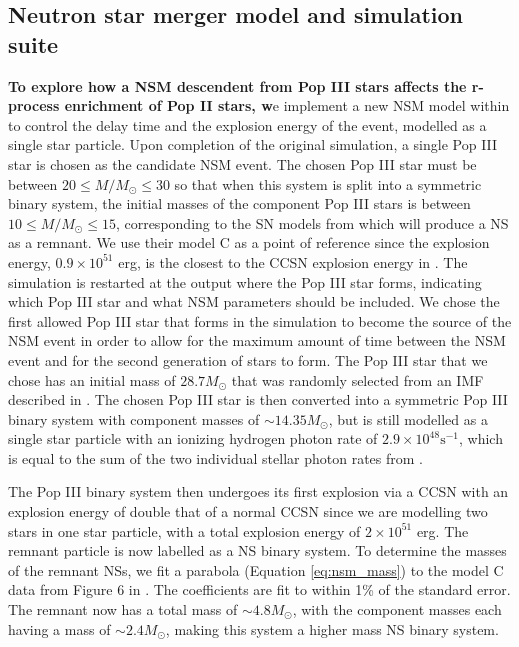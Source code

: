 \documentclass[fleqn,usenatbib]{mnras}
\begin{document}
\subsection{Neutron star merger model and simulation suite} \label{sec:NSM_model}
\textbf{To explore how a NSM descendent from Pop III stars affects the r-process enrichment of Pop II stars, w}e implement a new NSM model within \enzo{} to control the delay time and the explosion energy of the event, modelled as a single star particle. Upon completion of the original simulation, a single Pop III star is chosen as the candidate NSM event. The chosen Pop III star must be between $20 \leq M / M_{\odot} \leq 30$ so that when this system is split into a symmetric binary system, the initial masses of the component Pop III stars is between $10 \leq M / M_{\odot} \leq 15$, corresponding to the SN models from \citet{Heger10} which will produce a NS as a remnant. We use their model C as a point of reference since the explosion energy, $0.9 \times 10^{51}$ erg, is the closest to the CCSN explosion energy in \enzo{}. The simulation is restarted at the output where the Pop III star forms, indicating which Pop III star and what NSM parameters should be included. We chose the first allowed Pop III star that forms in the simulation to become the source of the NSM event in order to allow for the maximum amount of time between the NSM event and for the second generation of stars to form. The Pop III star that we chose has an initial mass of $28.7 M_{\odot}$ that was randomly selected from an IMF described in \citet{Skinner20}. The chosen Pop III star is then converted into a symmetric Pop III binary system with component masses of $\sim 14.35 M_{\odot}$, but is still modelled as a single star particle with an ionizing hydrogen photon rate of $2.9 \times 10^{48} \mathrm{s}^{-1}$, which is equal to the sum of the two individual stellar photon rates from \citet{Schaerer02}.

The Pop III binary system then undergoes its first explosion via a CCSN with an explosion energy of double that of a normal CCSN since we are modelling two stars in one star particle, with a total explosion energy of $2 \times 10^{51}$ erg. The remnant particle is now labelled as a NS binary system. To determine the masses of the remnant NSs, we fit a parabola (Equation \ref{eq:nsm_mass}) to the model C data from Figure 6 in \citet{Heger10}. The coefficients are fit to within 1\% of the standard error. The remnant now has a total mass of $\sim 4.8 M_{\odot}$, with the component masses each having a mass of $\sim 2.4 M_{\odot}$, making this system a higher mass NS binary system.
\end{document}
